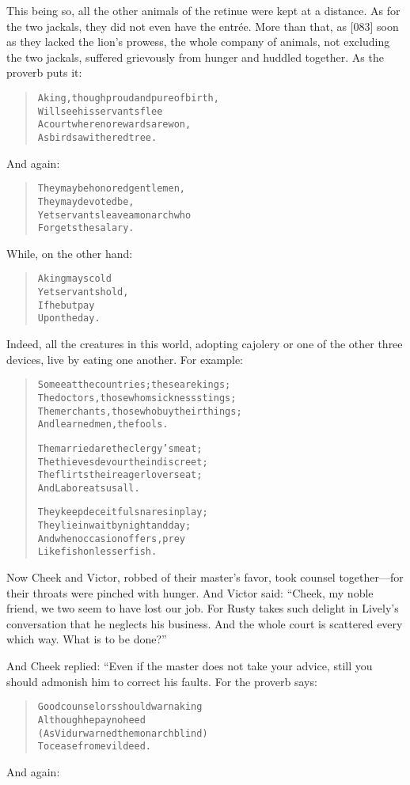 \documentclass[article, twoside, 14pt]{memoir}
\renewenvironment{verbatim}{%
\begin{quote}%
\vskip -10pt%
\begin{alltt}\normalfont\large}{\end{alltt}%
\end{quote}%
\vskip -10pt
} %
\begin{document}
This being so, all the other animals of the retinue were kept at a
distance. As for the two jackals, they did not even have the
entrée. More than that, as [083] soon as they lacked the lion's
prowess, the whole company of animals, not excluding the two
jackals, suffered grievously from hunger and huddled together. As
the proverb puts it:

\begin{verbatim}
A king, though proud and pure of birth,
    Will see his servants flee
A court where no rewards are won,
    As birds a withered tree.
\end{verbatim}
And again:

\begin{verbatim}
They may be honored gentlemen,
    They may devoted be,
Yet servants leave a monarch who
    Forgets the salary.
\end{verbatim}
While, on the other hand:

\begin{verbatim}
A king may scold
Yet servants hold,
If he but pay
Upon the day.
\end{verbatim}
Indeed, all the creatures in this world, adopting cajolery or one
of the other three devices, live by eating one another. For
example:

\begin{verbatim}
Some eat the countries; these are kings;
The doctors, those whom sickness stings;
The merchants, those who buy their things;
And learned men, the fools.

The married are the clergy's meat;
The thieves devour the indiscreet;
The flirts their eager lovers eat;
And Labor eats us all.

They keep deceitful snares in play;
They lie in wait by night and day;
And when occasion offers, prey
Like fish on lesser fish.
\end{verbatim}
Now Cheek and Victor, robbed of their master's favor, took counsel
together---for their throats were pinched with hunger. And Victor
said:
``Cheek, my noble friend, we two seem to have lost our job. For Rusty takes such delight in Lively's conversation that he neglects his business. And the whole court is scattered every which way. What is to be done?''

And Cheek replied: “Even if the master does not take your advice,
still you should admonish him to correct his faults. For the
proverb says:

\begin{verbatim}
Good counselors should warn a king
    Although he pay no heed
(As Vidur warned the monarch blind)
    To cease from evil deed.
\end{verbatim}
And again:
\end{document}
